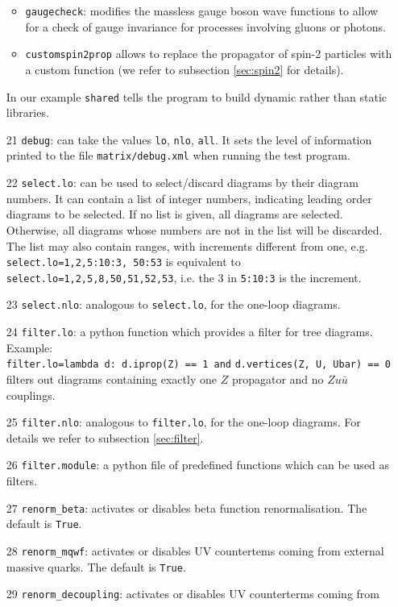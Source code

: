 \documentclass[11pt,a4paper]{refrep}
\begin{document}
\begin{enumerate}
\begin{itemize}
\item {\tt gaugecheck}:  modifies the massless gauge boson wave functions to allow for
a check of gauge invariance for processes involving 
gluons or photons. 
\item {\tt customspin2prop} allows to replace the propagator of spin-2 particles  
with a custom function (we refer to subsection \ref{sec:spin2} for details).
\end{itemize}
In our example {\tt shared} tells the program to 
build dynamic rather than static libraries.
\item[21] \texttt{debug}: can take the values  {\tt lo}, {\tt nlo}, {\tt all}.
It sets the level of information printed to the file {\tt matrix/debug.xml} when running the test program.
\item[22] \texttt{select.lo}: can be used to select/discard diagrams by their diagram numbers.
It can contain a list of integer numbers, indicating leading order diagrams to be
selected. If no list is given, all diagrams are selected.       
Otherwise, all diagrams whose numbers are not in the list will be discarded.          
The list may also contain ranges, with increments different from one, e.g.                                    
{\tt select.lo=1,2,5:10:3, 50:53} is equivalent to {\tt select.lo=1,2,5,8,50,51,52,53}, 
i.e. the 3 in    {\tt 5:10:3} is the increment.
\item[23] \texttt{select.nlo}: analogous to \texttt{select.lo},  for the one-loop diagrams.
\item[24] \texttt{filter.lo}:  a python function which provides a filter for tree diagrams.    
Example:  \\  
{\tt filter.lo=lambda d: d.iprop(Z) == 1  and}
{\tt  d.vertices(Z, U, Ubar) == 0 } filters out
diagrams containing exactly one $Z$ propagator and no $Zu\bar{u}$ couplings. 
\item[25] \texttt{filter.nlo}:  analogous to \texttt{filter.lo},  for the one-loop diagrams.
For details we refer to subsection \ref{sec:filter}.
\item[26] \texttt{filter.module}: a python file of predefined functions which can be used as filters.   
\item[27] \texttt{renorm\_beta}: activates or disables beta function renormalisation. The default is  {\tt True}. 
\item[28] \texttt{renorm\_mqwf}:  activates or disables UV countertems coming from
external massive quarks. The default is  {\tt True}.
\item[29] \texttt{renorm\_decoupling}:   activates or disables UV counterterms coming from  

\end{enumerate}
\end{document}
